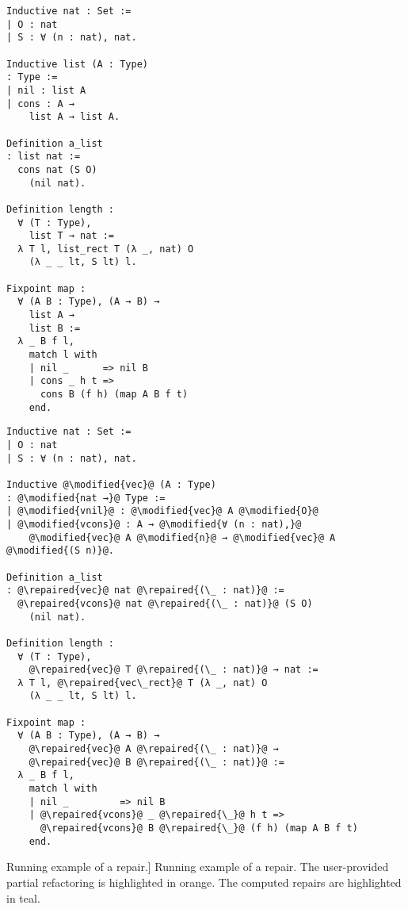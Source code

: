 \begin{figure*}[!htp]

  \noindent%
  \begin{minipage}[t]{0.50\textwidth}
    \begin{verbatim}
Inductive nat : Set :=
| O : nat
| S : ∀ (n : nat), nat.

Inductive list (A : Type)
: Type :=
| nil : list A
| cons : A →
    list A → list A.

Definition a_list
: list nat :=
  cons nat (S O)
    (nil nat).

Definition length :
  ∀ (T : Type),
    list T → nat :=
  λ T l, list_rect T (λ _, nat) O
    (λ _ _ lt, S lt) l.

Fixpoint map :
  ∀ (A B : Type), (A → B) →
    list A →
    list B :=
  λ _ B f l,
    match l with
    | nil _      => nil B
    | cons _ h t =>
      cons B (f h) (map A B f t)
    end.
  \end{verbatim}
\end{minipage}%
\begin{minipage}[t]{0.50\textwidth}
  \begin{verbatim}
Inductive nat : Set :=
| O : nat
| S : ∀ (n : nat), nat.

Inductive @\modified{vec}@ (A : Type)
: @\modified{nat →}@ Type :=
| @\modified{vnil}@ : @\modified{vec}@ A @\modified{O}@
| @\modified{vcons}@ : A → @\modified{∀ (n : nat),}@
    @\modified{vec}@ A @\modified{n}@ → @\modified{vec}@ A @\modified{(S n)}@.

Definition a_list
: @\repaired{vec}@ nat @\repaired{(\_ : nat)}@ :=
  @\repaired{vcons}@ nat @\repaired{(\_ : nat)}@ (S O)
    (nil nat).

Definition length :
  ∀ (T : Type),
    @\repaired{vec}@ T @\repaired{(\_ : nat)}@ → nat :=
  λ T l, @\repaired{vec\_rect}@ T (λ _, nat) O
    (λ _ _ lt, S lt) l.

Fixpoint map :
  ∀ (A B : Type), (A → B) →
    @\repaired{vec}@ A @\repaired{(\_ : nat)}@ →
    @\repaired{vec}@ B @\repaired{(\_ : nat)}@ :=
  λ _ B f l,
    match l with
    | nil _         => nil B
    | @\repaired{vcons}@ _ @\repaired{\_}@ h t =>
      @\repaired{vcons}@ B @\repaired{\_}@ (f h) (map A B f t)
    end.
  \end{verbatim}
\end{minipage}

\caption%
[Running example of a \Chick{} repair.]
{Running example of a \Chick{} repair.  The user-provided partial refactoring is highlighted in orange.  The computed repairs are highlighted in teal.}~\label{listtovec}

\end{figure*}

